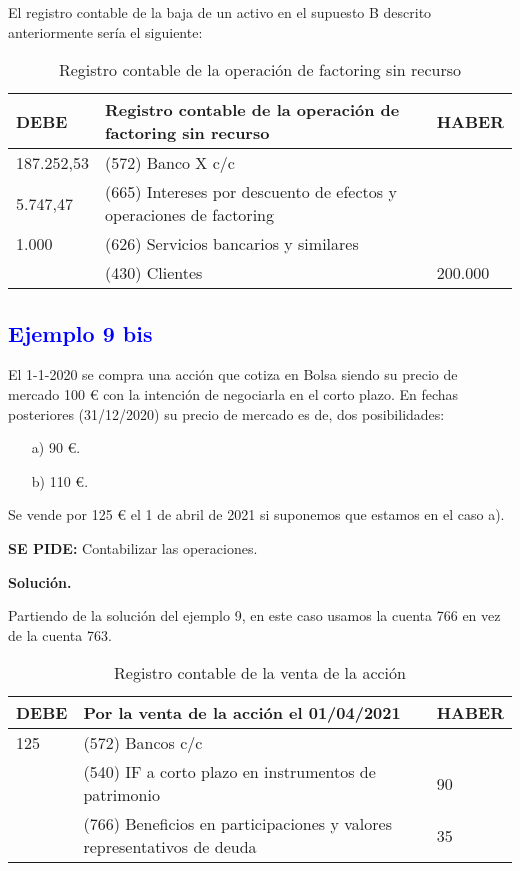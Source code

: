 El registro contable de la baja de un activo en el supuesto B descrito anteriormente sería el siguiente:

\begin{table}[H]
    \centering
    \begin{tabularx}{\textwidth}{|X|X|X|}
        \hline
        \rowcolor{blue!30}
        \textbf{DEBE} & \textbf{Registro contable de la operación de factoring sin recurso} & \textbf{HABER} \\
        \hline
        187.252,53 & (572) Banco X c/c & \\
        \hline
        5.747,47 & (665) Intereses por descuento de efectos y operaciones de factoring & \\
        \hline
        1.000 & (626) Servicios bancarios y similares & \\
        \hline
        & (430) Clientes & 200.000 \\
        \hline
    \end{tabularx}
    \caption{Registro contable de la operación de factoring sin recurso}
    \label{tab:factoring}
\end{table}

\subsection*{\textcolor{blue}{Ejemplo 9 bis}}

El 1-1-2020 se compra una acción que cotiza en Bolsa siendo su precio de mercado 100 € con la intención de negociarla en el corto plazo. En fechas posteriores (31/12/2020) su precio de mercado es de, dos posibilidades:
\begin{itemize}
    \item[a)] 90 €.
    \item[b)] 110 €.
\end{itemize}

Se vende por 125 € el 1 de abril de 2021 si suponemos que estamos en el caso a).

\textbf{SE PIDE:} Contabilizar las operaciones.

\textbf{Solución.}

Partiendo de la solución del ejemplo 9, en este caso usamos la cuenta 766 en vez de la cuenta 763.

\begin{table}[H]
    \centering
    \begin{tabular}{|p{3cm}|p{6cm}|p{3cm}|}
    \hline
    \rowcolor{blue!30}
    \textbf{DEBE} & \textbf{Por la venta de la acción el 01/04/2021} & \textbf{HABER} \\
    \hline
    125 & (572) Bancos c/c & \\
    \hline
    & (540) IF a corto plazo en instrumentos de patrimonio & 90 \\
    \hline
    & (766) Beneficios en participaciones y valores representativos de deuda & 35 \\
    \hline
    \end{tabular}
    \caption{Registro contable de la venta de la acción}
    \label{tabla:venta_accion}
\end{table}

